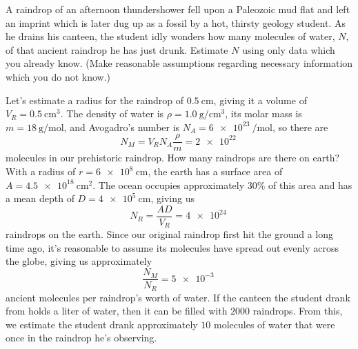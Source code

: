 \documentclass[../feynman-lectures-on-physics.tex]{subfiles}
\begin{document}
\begin{questions}

\question A raindrop of an afternoon thundershower fell upon a Paleozoic mud flat and left an imprint which is later dug up as a fossil by a hot, thirsty geology student. As he drains his canteen, the student idly wonders how many molecules of water, $N$, of that ancient raindrop he has just drunk. Estimate $N$ using only data which you already know. (Make reasonable assumptions regarding necessary information which you do not know.)

\begin{solution}
	Let's estimate a radius for the raindrop of $\SI{0.5}{\centi\meter}$, giving it a volume of $V_R = \SI{0.5}{\centi\meter\cubed}$. The density of water is $\rho = \SI{1.0}{\gram\per\centi\meter\cubed}$, its molar mass is $m = \SI{18}{\gram\per\mole}$, and Avogadro's number is $N_A = \SI{6e23}{\per\mole}$, so there are 
	\[
	N_M = V_RN_A\frac{\rho}{m} = \SI{2e22}{}
	\] 
	molecules in our prehistoric raindrop. How many raindrops are there on earth? With a radius of $r = \SI{6e8}{\centi\meter}$, the earth has a surface area of $A = \SI{4.5e18}{\centi\meter\squared}$. The ocean occupies approximately $30$\% of this area and has a mean depth of $D = \SI{4e5}{\centi\meter}$, giving us
	\[
	N_R = \frac{AD}{V_R} = \SI{4e24}{}
	\] 
	raindrops on the earth. Since our original raindrop first hit the ground a long time ago, it's reasonable to assume its molecules have spread out evenly across the globe, giving us approximately
	\[
	\frac{N_M}{N_R} = \SI{5e-3}{}
	\] 
	ancient molecules per raindrop's worth of water. If the canteen the student drank from holds a liter of water, then it can be filled with $2000$ raindrops. From this, we estimate the student drank approximately $10$ molecules of water that were once in the raindrop he's observing.
\end{solution}

\end{questions}
\end{document}
